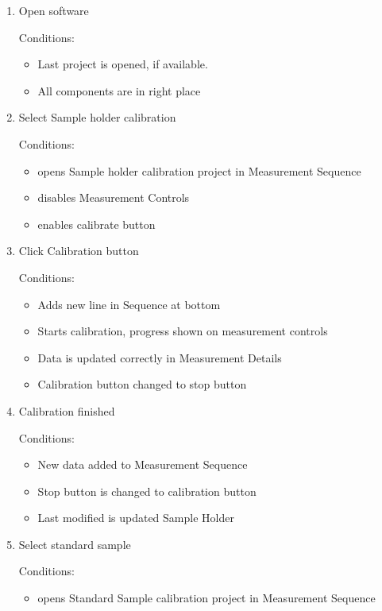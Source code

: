 \begin{enumerate}

\item Open software

Conditions:
\begin{itemize}
\item Last project is opened, if available.
\item All components are in right place
\end{itemize}

\item Select Sample holder calibration

Conditions:
\begin{itemize}
\item opens Sample holder calibration project in Measurement Sequence
\item disables Measurement Controls
\item enables calibrate button
\end{itemize}

\item Click Calibration button

Conditions:
\begin{itemize}
\item Adds new line in Sequence at bottom
\item Starts calibration, progress shown on measurement controls
\item Data is updated correctly in Measurement Details
\item Calibration button changed to stop button
\end{itemize}

\item Calibration finished

Conditions:
\begin{itemize}
\item New data added to Measurement Sequence
\item Stop button is changed to calibration button
\item Last modified is updated Sample Holder
\end{itemize}

\item Select standard sample

Conditions:
\begin{itemize}
\item opens Standard Sample calibration project in Measurement Sequence
\end{itemize}


\end{enumerate}
